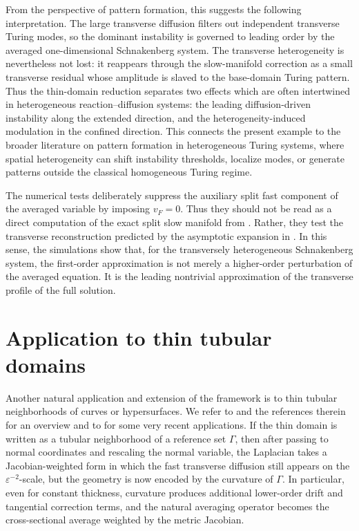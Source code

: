\documentclass[11pt]{article}
\theoremstyle{definition}
\theoremstyle{remark}
\numberwithin{equation}{section}
\begin{document}
From the perspective of pattern formation, this suggests the following
interpretation. The large transverse diffusion filters out independent
transverse Turing modes, so the dominant instability is governed to leading
order by the averaged one-dimensional Schnakenberg system. The transverse
heterogeneity is nevertheless not lost: it reappears through the
slow-manifold correction as a small transverse residual whose amplitude is
slaved to the base-domain Turing pattern. Thus the thin-domain reduction
separates two effects which are often intertwined in heterogeneous
reaction--diffusion systems: the leading diffusion-driven instability along
the extended direction, and the heterogeneity-induced modulation in the
confined direction. This connects the present example to the broader
literature on pattern formation in heterogeneous Turing systems, where
spatial heterogeneity can shift instability thresholds, localize modes, or
generate patterns outside the classical homogeneous Turing regime.

The numerical tests deliberately suppress the auxiliary split fast component
of the averaged variable by imposing \(v_F=0\). Thus they should not be read
as a direct computation of the exact split slow manifold from
. Rather, they test the transverse reconstruction
predicted by the asymptotic expansion in . In this sense,
the simulations show that, for the transversely heterogeneous Schnakenberg
system, the first-order approximation is not merely a higher-order
perturbation of the averaged equation. It is the leading nontrivial
approximation of the transverse profile of the full solution.



\section{Application to thin tubular domains}\label{sec:tubular domains}
Another natural application and extension of the framework is to thin tubular neighborhoods of curves or hypersurfaces.
We refer to \cite{yanagida1990existence,PrizziRybakowski2002} and the references therein for an overview and to \cite{miura2026thin,DeGaspari2026} for some very recent applications.
If the thin domain is written as a tubular neighborhood of a reference set \(\Gamma\), then after passing to normal coordinates and rescaling the normal variable, the Laplacian takes a Jacobian-weighted form in which the fast transverse diffusion still appears on the \(\varepsilon^{-2}\)-scale, but the geometry is now encoded by the curvature of \(\Gamma\). 
In particular, even for constant thickness, curvature produces additional lower-order drift and tangential correction terms, and the natural averaging operator becomes the cross-sectional average weighted by the metric Jacobian. 
\end{document}
